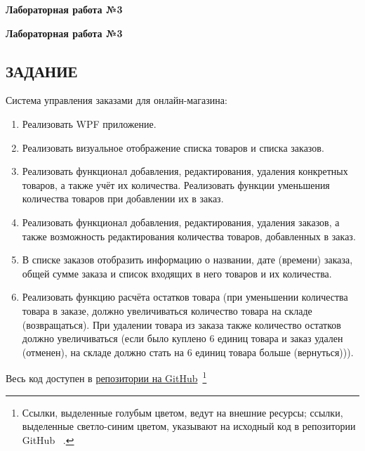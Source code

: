 \documentclass[12pt]{article}
\newcommand{\lablogo}
{
\begin{center}
    \huge{\textbf{Лабораторная работа №3}} \\
\end{center}
}
\newcommand{\colorURL}[1]{\textcolor{CtpBlue}{#1}}
\newcommand{\colorGIT}[1]{\textcolor{CtpLavender}{#1}}
\renewcommand{\texttt}[1]{{\small\ttfamily #1}}
\numberwithin{listing}{section}
\numberwithin{figure}{section}
\begin{document}
\pagestyle{empty}

\lablogo

\tableofcontents
\newpage
\renewcommand\listoflistingscaption{Листинг}
\listoflistings

\newpage

\pagestyle{fancy}

\newpage

\lablogo

\begin{center}
	\section{ЗАДАНИЕ \ \texorpdfstring{\faScroll}{}}
\end{center}

\noindent Система управления заказами для онлайн-магазина:
\begin{enumerate}
	\item Реализовать \texttt{WPF} приложение.
	\item Реализовать визуальное отображение списка товаров и списка заказов.
	\item Реализовать функционал добавления, редактирования, удаления конкретных товаров, а также учёт их количества. Реализовать функции уменьшения количества товаров при добавлении их в заказ.
	\item Реализовать функционал добавления, редактирования, удаления заказов, а также возможность редактирования количества товаров, добавленных в заказ.
	\item В списке заказов отобразить информацию о названии, дате (времени) заказа, общей сумме заказа и список входящих в него товаров и их количества.
	\item Реализовать функцию расчёта остатков товара (при уменьшении количества товара в заказе, должно увеличиваться количество товара на складе (возвращаться). При удалении товара из заказа также количество остатков должно увеличиваться (если было куплено 6 единиц товара и заказ удален (отменен), на складе должно стать на 6 единиц товара больше (вернуться))).
\end{enumerate}
Весь код доступен в \colorURL{\href{https://github.com/WebMasterIT/Csharp_Labs/tree/main}{репозитории на GitHub}\ \faGithub}\footnote{Ссылки, выделенные \colorURL{голубым} цветом, ведут на внешние ресурсы; ссылки, выделенные \colorGIT{светло-синим} цветом, указывают на исходный код в репозитории GitHub \ \faGithub.}
\end{document}
